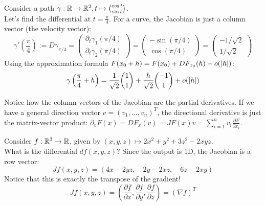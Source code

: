 \begin{example*}
Consider a path $\gamma: \mathbb{R} \to \mathbb{R}^2, t \mapsto \binom{\cos t}{\sin t}$. \\
Let's find the differential at $t = \frac{\pi}{4}$. For a curve, the Jacobian is just a column vector (the velocity vector):
\[ \gamma'\left(\frac{\pi}{4}\right) := D\gamma_{\pi/4} = \begin{pmatrix} \partial_t \gamma_1(\pi/4) \\ \partial_t \gamma_2(\pi/4) \end{pmatrix} = \begin{pmatrix} -\sin(\pi/4) \\ \cos(\pi/4) \end{pmatrix} = \begin{pmatrix} -1/\sqrt{2} \\ 1/\sqrt{2} \end{pmatrix} \]
Using the approximation formula $F(x_0 + h) = F(x_0) + DF_{x_0}(h) + o(\lvert h\rvert)$:
\[ \gamma\left(\frac{\pi}{4} + h\right) = \frac{1}{\sqrt{2}}\binom{1}{1} + \frac{h}{\sqrt{2}}\binom{-1}{1} + o(\lvert h\rvert) \]

\begin{center}
\end{center}
\textcolor{eGray}{Notice how the column vectors of the Jacobian are the partial derivatives. If we have a general direction vector $v = (v_1, \dots, v_n)^T$, the directional derivative is just the matrix-vector product: $\partial_v F(x) = DF_x(v) = JF(x)v = \sum_{i=1}^n v_i \frac{\partial F}{\partial x_i}$.}
\end{example*}

\begin{example*}
Consider $f: \mathbb{R}^3 \to \mathbb{R}$, given by $(x,y,z) \mapsto 2x^2 + y^2 + 3z^2 - 2xyz$. \\
What is the differential $df(x,y,z)$? Since the output is 1D, the Jacobian is a row vector:
\[ Jf(x,y,z) = \left( 4x - 2yz, \quad 2y - 2xz, \quad 6z - 2xy \right) \]
Notice that this is exactly the transpose of the gradient!
\[ Jf(x,y,z) = \left( \frac{\partial f}{\partial x}, \frac{\partial f}{\partial y}, \frac{\partial f}{\partial z} \right) = (\nabla f)^T \]
\end{example*}

